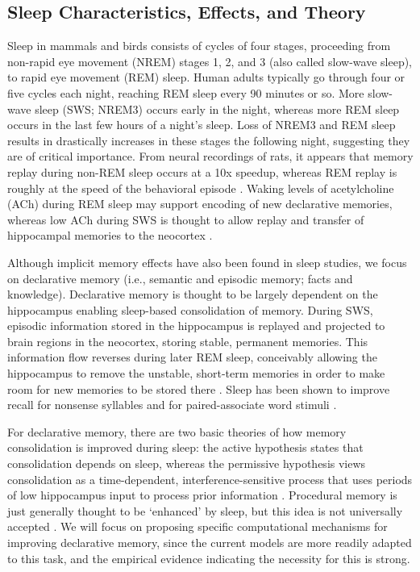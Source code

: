 \documentclass[10pt,letterpaper]{article}
\begin{document}
\subsection{Sleep Characteristics, Effects, and Theory}
\vspace{-.1cm}
Sleep in mammals and birds consists of cycles of four stages, proceeding from non-rapid eye movement (NREM) stages 1, 2, and 3 (also called slow-wave sleep), to rapid eye movement (REM) sleep. Human adults typically go through four or five cycles each night, reaching REM sleep every 90 minutes or so. More slow-wave sleep (SWS; NREM3) occurs early in the night, whereas more REM sleep occurs in the last few hours of a night's sleep. Loss of NREM3 and REM sleep results in drastically increases in these stages the following night, suggesting they are of critical importance. From neural recordings of rats, it appears that memory replay during non-REM sleep occurs at a 10x speedup, whereas REM replay is roughly at the speed of the behavioral episode \cite{Bendor:2012}. Waking levels of acetylcholine (ACh) during REM sleep may support encoding of new declarative memories, whereas low ACh during SWS is thought to allow replay and transfer of hippocampal memories to the neocortex \cite{Hasselmo:1999}.

Although implicit memory effects have also been found in sleep studies, we focus on declarative memory (i.e., semantic and episodic memory; facts and knowledge). Declarative memory is thought to be largely dependent on the hippocampus enabling sleep-based consolidation of memory. During SWS, episodic information stored in the hippocampus is replayed and projected to brain regions in the neocortex, storing stable, permanent memories. This information flow reverses during later REM sleep, conceivably allowing the hippocampus to remove the unstable, short-term memories in order to make room for new memories to be stored there \cite{Wamsley:2011}. Sleep has been shown to improve recall for nonsense syllables \cite{Jenkins:1924} and for paired-associate word stimuli \cite{Gais:2004}. 

For declarative memory, there are two basic theories of how memory consolidation is improved during sleep: the active hypothesis states that consolidation depends on sleep, whereas the permissive hypothesis views consolidation as a time-dependent, interference-sensitive process that uses periods of low hippocampus input to process prior information \cite{Mednick:2010}. Procedural memory is just generally thought to be `enhanced' by sleep, but this idea is not universally accepted \cite{Mednick:2010}. We will focus on proposing specific computational mechanisms for improving declarative memory, since the current models are more readily adapted to this task, and the empirical evidence indicating the necessity for this is strong.
\end{document}
